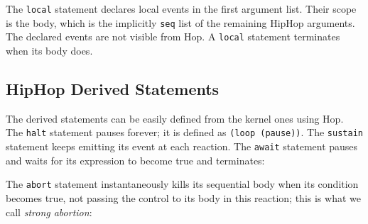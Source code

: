 \documentclass{llncs}
\begin{document}
The {\texttt{local{}}} statement declares local events in the
first argument list. Their scope is the body, which is the implicitly
{\texttt{seq{}}} list of the remaining HipHop arguments. The
declared events are not visible from Hop. A {\texttt{local{}}}
statement terminates when its body does.

\subsection{HipHop Derived Statements}
\label{HipHop derived statements}

The derived statements can be easily defined from the kernel ones using Hop.
The {\texttt{halt{}}} statement 
pauses forever; it is defined as \texttt{(loop{} (pause{}))}.
The {\texttt{sustain{}}} statement
keeps emitting its event at each reaction. The {\texttt{await{}}} statement pauses and 
waits for
its expression to become true and terminates:

{\footnotesize{
}}
\noindent The {\texttt{abort{}}} statement
instantaneously kills its sequential body when its condition becomes true, not
passing the control to its body in this reaction; this is what we call
{\em{strong abortion}}:
\end{document}
